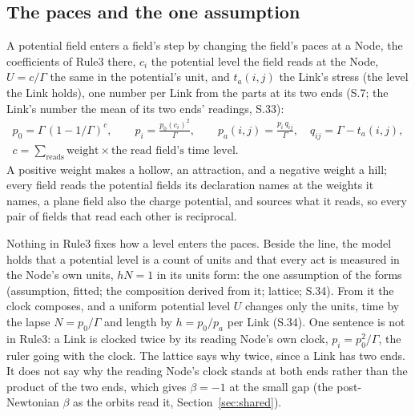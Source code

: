 \documentclass[pdflatex,sn-mathphys-num]{sn-jnl}
\theoremstyle{thmstyleone}
\theoremstyle{thmstyletwo}
\begin{document}
\subsection{The paces and the one assumption}\label{sec:paces}

A potential field enters a field's step by changing the field's paces at a Node, the coefficients of Rule3 there, $c_i$ the potential level the field reads at the Node, $U = c / \Gamma$ the same in the potential's unit, and $t_a(i, j)$ the Link's stress (the level the Link holds), one number per Link from the parts at its two ends (S.7; the Link's number the mean of its two ends' readings, S.33):
\begin{equation}\label{eq:paces}
\boxed{\begin{aligned}
p_0 = \Gamma\,(1 - 1 / \Gamma)^{c}, \qquad p_i = \frac{p_0(c_i)^2}{\Gamma}, \qquad p_a(i, j) = \frac{p_i\,q_{ij}}{\Gamma}, \quad q_{ij} = \Gamma - t_a(i, j), \\ c = \sum_{\text{reads}} \text{weight} \times \text{the read field's time level}.
\end{aligned}}
\end{equation}
A positive weight makes a hollow, an attraction, and a negative weight a hill; every field reads the potential fields its declaration names at the weights it names, a plane field also the charge potential, and sources what it reads, so every pair of fields that read each other is reciprocal.

Nothing in Rule3 fixes how a level enters the paces. Beside the line, the model holds that a potential level is a count of units and that every act is measured in the Node's own units, $hN = 1$ in its units form: the one assumption of the forms (assumption, fitted; the composition derived from it; lattice; S.34). From it the clock composes, and a uniform potential level $U$ changes only the units, time by the lapse $N = p_0 / \Gamma$ and length by $h = p_0 / p_a$ per Link (S.34). One sentence is not in Rule3: a Link is clocked twice by its reading Node's own clock, $p_i = p_0^2 / \Gamma$, the ruler going with the clock. The lattice says why twice, since a Link has two ends. It does not say why the reading Node's clock stands at both ends rather than the product of the two ends, which gives $\beta = -1$ at the small gap (the post-Newtonian $\beta$ as the orbits read it, Section~\ref{sec:shared}).
\end{document}
